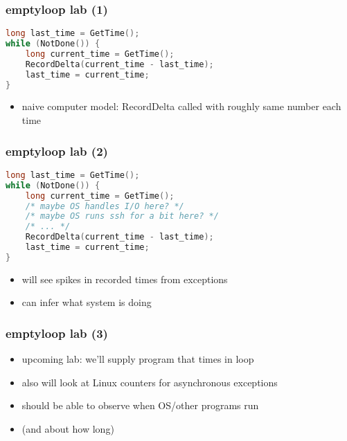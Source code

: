 \begin{frame}[fragile]\frametitle{emptyloop lab (1)}
\begin{lstlisting}[language=C]
long last_time = GetTime();
while (NotDone()) {
    long current_time = GetTime();
    RecordDelta(current_time - last_time);
    last_time = current_time;
}
\end{lstlisting}
\begin{itemize}
\item naive computer model: RecordDelta called with roughly same number each time
\end{itemize}
\end{frame}

\begin{frame}[fragile]\frametitle{emptyloop lab (2)}
\begin{lstlisting}[language=C]
long last_time = GetTime();
while (NotDone()) {
    long current_time = GetTime();
    /* maybe OS handles I/O here? */
    /* maybe OS runs ssh for a bit here? */
    /* ... */
    RecordDelta(current_time - last_time);
    last_time = current_time;
}
\end{lstlisting}
\begin{itemize}
\item will see spikes in recorded times from exceptions
\item can infer what system is doing
\end{itemize}
\end{frame}

\begin{frame}\frametitle{emptyloop lab (3)}
\begin{itemize}
    \item upcoming lab: we'll supply program that times in loop
    \item also will look at Linux counters for asynchronous exceptions
    \vspace{.5cm}
    \item should be able to observe when OS/other programs run
    \item (and about how long)
\end{itemize}
\end{frame}

